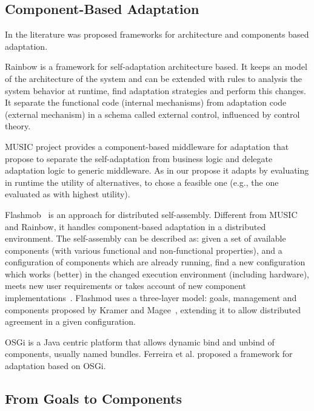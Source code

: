 \subsection{Component-Based Adaptation}

In the literature was proposed frameworks for architecture and components based adaptation.

Rainbow\cite{garlan_rainbow:_2004} is a framework for self-adaptation architecture based. It keeps an model of the architecture of the system and can be extended with rules to analysis the system behavior at runtime, find adaptation strategies and perform this changes. It separate the functional code (internal mechanisms) from adaptation code (external mechanism) in a schema called external control, influenced by control theory.

MUSIC\cite{rouvoy_music:_2009} project provides a component-based middleware for adaptation that propose to separate the self-adaptation from business logic and delegate adaptation logic to generic middleware. As in our propose it adapts by evaluating in runtime the utility of alternatives, to chose a feasible one (e.g., the one evaluated as with highest utility).

Flashmob~\cite{sykes_flashmob:_2011} is an approach for distributed self-assembly. Different from MUSIC and Rainbow, it handles component-based adaptation in a distributed environment. The self-assembly can be described as: given a set of available components (with various functional and non-functional properties), and a configuration of components which are already running, find a new configuration which works (better) in the changed execution environment (including hardware),
meets new user requirements or takes account of new component implementations~\cite{sykes_flashmob:_2011}. Flashmod uses a three-layer model: goals, management and components proposed by Kramer and Magee~\cite{kramer_self-managed_2007}, extending it to allow distributed agreement in a given configuration.

OSGi\cite{the_osgi_alliance_osgi_2007} is a Java centric platform that allows dynamic bind and unbind of components, usually named bundles. Ferreira et al.\cite{ferreira_-osgi:_2012} proposed a framework for adaptation based on OSGi.

\subsection{From Goals to Components}

